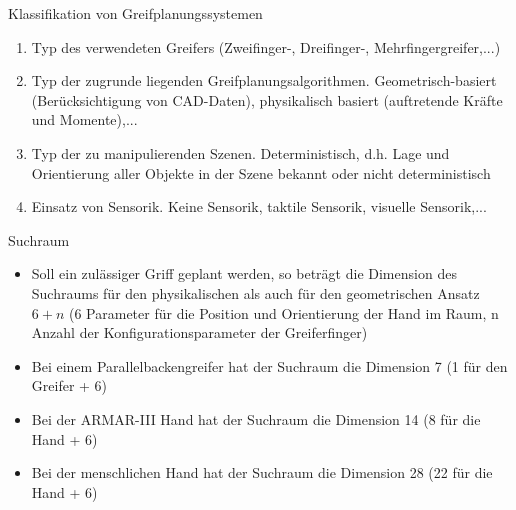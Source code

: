 \documentclass[paper=a4, fontsize=11pt]{scrartcl} %
\numberwithin{equation}{section} %
\numberwithin{figure}{section} %
\numberwithin{table}{section} %
\begin{document}
Klassifikation von Greifplanungssystemen
\begin{enumerate}
\item Typ des verwendeten Greifers (Zweifinger-, Dreifinger-, Mehrfingergreifer,...)
\item Typ der zugrunde liegenden Greifplanungsalgorithmen. Geometrisch-basiert (Berücksichtigung von CAD-Daten), physikalisch basiert (auftretende Kräfte und Momente),...
\item Typ der zu manipulierenden Szenen. Deterministisch, d.h. Lage und Orientierung aller Objekte in der Szene bekannt oder nicht deterministisch
\item Einsatz von Sensorik. Keine Sensorik, taktile Sensorik, visuelle Sensorik,...
\end{enumerate}

Suchraum
\begin{itemize}
\item Soll ein zulässiger Griff geplant werden, so beträgt die Dimension des Suchraums für den physikalischen als auch für den geometrischen Ansatz $6+n$ (6 Parameter für die Position und Orientierung der Hand im Raum, n Anzahl der Konfigurationsparameter der Greiferfinger)
\item Bei einem Parallelbackengreifer hat der Suchraum die Dimension 7 (1 für den Greifer + 6)
\item Bei der ARMAR-III Hand hat der Suchraum die Dimension 14 (8 für die Hand + 6)
\item Bei der menschlichen Hand hat der Suchraum die Dimension 28 (22 für die Hand + 6)
\end{itemize}
\end{document}
